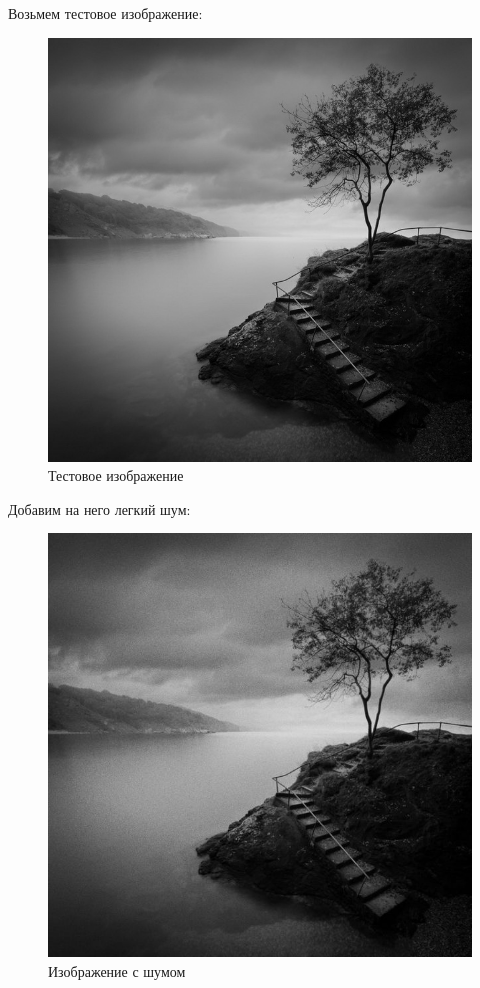 \documentclass[14pt,a4paper,report]{report}
\begin{document}
Возьмем тестовое изображение:
\begin{figure}[h!]
	\centering
	\includegraphics[scale = 0.3]{images/orig.jpg}
	\caption{Тестовое изображение}
\end{figure}



\clearpage

Добавим на него легкий шум:
\begin{figure}[h!]
	\centering
	\includegraphics[scale = 0.3]{images/noise.jpg}
	\caption{Изображение с шумом}
\end{figure}
\end{document}
